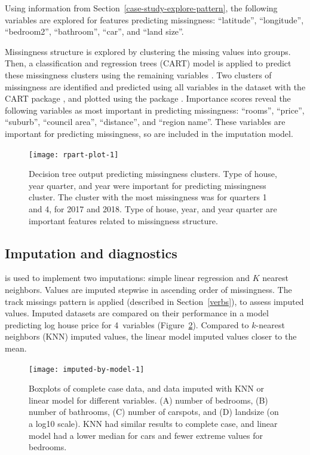 \documentclass[article]{jss}
\begin{document}
Using information from Section~\ref{case-study-explore-pattern}, the following
variables are explored for features predicting missingness: ``latitude'',
``longitude'', ``bedroom2'', ``bathroom'', ``car'', and ``land size''.

Missingness structure is explored by clustering the missing values into
groups.  Then, a classification and regression trees (CART) model is applied
to predict these missingness clusters using the remaining variables
\citep{Tierney2015, Barnett2017}.  Two clusters of missingness are
identified and predicted using all variables in the dataset with the CART
package  \citep{rpart}, and plotted using the 
package \citep{rpart-plot}.  Importance scores reveal the following
variables as most important in predicting missingness: ``rooms'', ``price'',
``suburb'', ``council area'', ``distance'', and ``region name''.  These
variables are important for predicting missingness, so are included in the
imputation model.

\begin{figure}[t!]
\centering
\texttt{[image: rpart-plot-1]}
\caption[Decision tree output predicting missingness clusters]{Decision tree
output predicting missingness clusters.  Type of house, year quarter, and
year were important for predicting missingness cluster.  The cluster with
the most missingness was for quarters 1 and 4, for 2017 and 2018.  Type of
house, year, and year quarter are important features related to missingness
structure.}\label{fig:rpart-plot}
\end{figure}

\hypertarget{case-study-imp-diagnosis}{%
\subsection{Imputation and diagnostics}\label{case-study-imp-diagnosis}}

 is used to implement two imputations: simple linear
regression and $K$ nearest neighbors.  Values are imputed stepwise in
ascending order of missingness.  The track missings pattern is applied
(described in Section~\ref{verbs}), to assess imputed values.  Imputed datasets are
compared on their performance in a model predicting log house price for 4~variables
(Figure~\ref{fig:imputed-by-model}).  Compared to $k$-nearest neighbors (KNN) imputed
values, the linear model imputed values closer to the mean.

\begin{figure}[t!]
\centering
\texttt{[image: imputed-by-model-1]}
\caption[Boxplots of complete case data, and data imputed with KNN or linear
model for different variables]{Boxplots of complete case data, and data
imputed with KNN or linear model for different variables.  (A) number of
bedrooms, (B) number of bathrooms, (C) number of carspots, and (D) landsize
(on a log10 scale).  KNN had similar results to complete case, and linear
model had a lower median for cars and fewer extreme values for
bedrooms.}\label{fig:imputed-by-model}
\end{figure}
\end{document}
